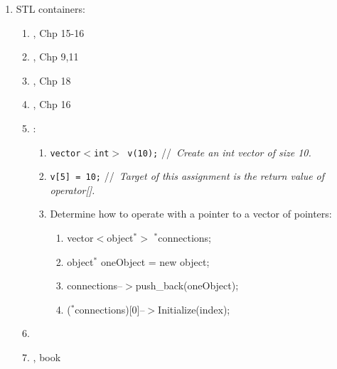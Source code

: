 \begin{enumerate}
\begin{enumerate}
	\item \cite[\S16.5, 983--996]{Gaddis2012}
	\item \cite{Josuttis2012}
	\item \cite[Chp. 18, pp. 943--998]{Savitch2009}
	\item \cite{Reese2006a}
	\item \cite[Chp. 16, pp. 877--922, 930--940]{Prata2005}
	\item \cite[Chp. 21, 499--545]{Schildt2003a}
	\item \cite{Robson2000}
	\item \cite{Josuttis1999a}
	\end{enumerate}
\item STL containers: \vspace{-0.3cm}
	\begin{enumerate} \itemsep -2pt
	\item \cite{Gregoire2014}, Chp 15-16
	\item \cite{Lippman2013}, Chp 9,11
	\item \cite{Allain2012}, Chp 18
	\item \cite{Prata2012}, Chp 16
	\item \cite{EliteHussar2010}: \vspace{-0.2cm}
		\begin{enumerate} \itemsep -2pt
		\item {\tt vector$<$int$>$ v(10);} \hspace{0.2in} //{\it\ Create an int vector of size 10.}
		\item {\tt v[5] = 10;} //{\it\ Target of this assignment is the return value of operator[].}
		\item Determine how to operate with a pointer to a vector of pointers: \vspace{-0.1cm}
			\begin{enumerate} \itemsep -1pt
			\item vector$<$object$^{\ast}>$ $^{\ast}$connections;
			\item object$^{\ast}$ oneObject = new object;
			\item connections--$>$push\_back(oneObject);
			\item ($^{\ast}$connections)[0]--$>$Initialize(index);
			\end{enumerate}
		\end{enumerate}
	\item \cite[\S18.2, pp. 960--977]{Savitch2009}
	\item \cite{Reese2006a}, book

\end{enumerate}
\end{enumerate}

